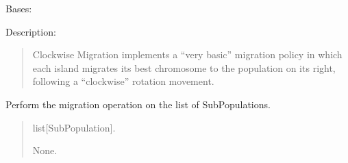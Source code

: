\documentclass[letterpaper,10pt,english]{sphinxmanual}
\begin{document}
\begin{fulllineitems}
\label{\detokenize{pygenalgo.operators.migration:pygenalgo.operators.migration.clockwise_migration.ClockwiseMigration}}
\pysigstartsignatures
{}
\pysigstopsignatures
\sphinxAtStartPar
Bases: {\hyperref[\detokenize{pygenalgo.operators.migration:pygenalgo.operators.migration.migration_operator.MigrationOperator}]{}}

\sphinxAtStartPar
Description:
\begin{quote}

\sphinxAtStartPar
Clockwise Migration implements a “very basic” migration policy in which
each island migrates its best chromosome to the population on its right,
following a “clockwise” rotation movement.
\end{quote}

\begin{fulllineitems}
\label{\detokenize{pygenalgo.operators.migration:pygenalgo.operators.migration.clockwise_migration.ClockwiseMigration.migrate}}
\pysigstartsignatures
{}
\pysigstopsignatures
\sphinxAtStartPar
Perform the migration operation on the list of SubPopulations.
\begin{quote}\begin{description}
\sphinxAtStartPar
{} \textendash{} list{[}SubPopulation{]}.

\sphinxAtStartPar
None.

\end{description}\end{quote}

\end{fulllineitems}


\end{fulllineitems}
\end{document}
